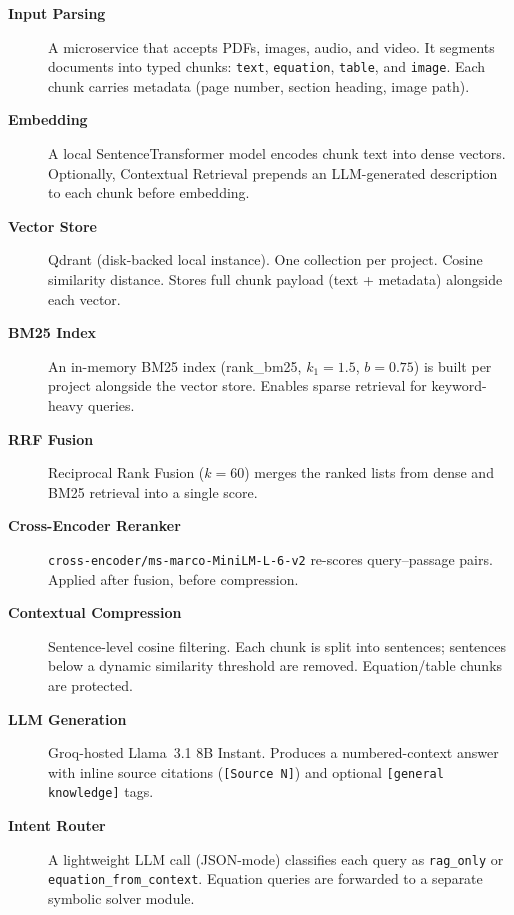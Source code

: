 \documentclass[12pt,a4paper]{article}
\begin{document}
\begin{description}
  \item[\textbf{Input Parsing}] A microservice that accepts PDFs, images, audio, and video. It segments documents into typed chunks: \texttt{text}, \texttt{equation}, \texttt{table}, and \texttt{image}. Each chunk carries metadata (page number, section heading, image path).

  \item[\textbf{Embedding}] A local SentenceTransformer model encodes chunk text into dense vectors. Optionally, Contextual Retrieval prepends an LLM-generated description to each chunk before embedding.

  \item[\textbf{Vector Store}] Qdrant (disk-backed local instance). One collection per project. Cosine similarity distance. Stores full chunk payload (text + metadata) alongside each vector.

  \item[\textbf{BM25 Index}] An in-memory BM25 index (rank\_bm25, $k_1=1.5$, $b=0.75$) is built per project alongside the vector store. Enables sparse retrieval for keyword-heavy queries.

  \item[\textbf{RRF Fusion}] Reciprocal Rank Fusion ($k=60$) merges the ranked lists from dense and BM25 retrieval into a single score.

  \item[\textbf{Cross-Encoder Reranker}] \texttt{cross-encoder/ms-marco-MiniLM-L-6-v2} re-scores query--passage pairs. Applied after fusion, before compression.

  \item[\textbf{Contextual Compression}] Sentence-level cosine filtering. Each chunk is split into sentences; sentences below a dynamic similarity threshold are removed. Equation/table chunks are protected.

  \item[\textbf{LLM Generation}] Groq-hosted Llama~3.1 8B Instant. Produces a numbered-context answer with inline source citations (\texttt{[Source N]}) and optional \texttt{[general knowledge]} tags.

  \item[\textbf{Intent Router}] A lightweight LLM call (JSON-mode) classifies each query as \texttt{rag\_only} or \texttt{equation\_from\_context}. Equation queries are forwarded to a separate symbolic solver module.
\end{description}
\end{document}

